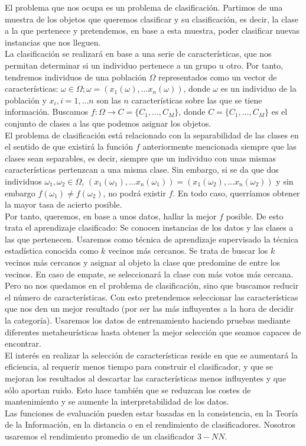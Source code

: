 \documentclass[11pt,leqno]{article}
\begin{document}
El problema que nos ocupa es un problema de clasificación. Partimos de una muestra de los objetos que queremos clasificar y su clasificación, es decir, la clase a la que pertenece y pretendemos, en base a esta muestra, poder clasificar nuevas instancias que nos lleguen.\\
La clasificación se realizará en base a una serie de características, que nos permitan determinar si un individuo pertenece a un grupo u otro. Por tanto, tendremos individuos de una población $\Omega$ representados como un vector de características: $ \omega \in \Omega; \omega = (x_1(\omega), \dots x_n(\omega))$, donde $\omega$ es un individuo de la población y $x_i, i=1,\dots n$ son las $n$ características sobre las que se tiene información. Buscamos $f:\Omega \longrightarrow C=\{C_1, \dots, C_M\}$, donde $C=\{C_1, \dots, C_M\}$ es el conjunto de clases a las que podemos asignar los objetos.\\
El problema de clasificación está relacionado con la separabilidad de las clases en el sentido de que existirá la función $f$  anteriormente mencionada siempre que las clases sean separables, es decir, siempre que un individuo con unas mismas características pertenzcan a una misma clase. Sin embargo, si se da que dos individuos $\omega_1, \omega_2 \in \Omega$, $(x_1(\omega_1), \dots x_n(\omega_1))=(x_1(\omega_2), \dots x_n(\omega_2))$ y sin embargo $f(\omega_1) \neq f(\omega_2)$, no podrá existir $f$. En todo caso, querríamos obtener la mayor tasa de acierto posible.\\  
Por tanto, queremos, en base a unos datos, hallar la mejor $f$ posible. De esto trata el aprendizaje clasificado: Se conocen instancias de los datos y las clases a las que pertenecen. Usaremos como técnica de aprendizaje supervisado la técnica estadística conocida como $k$ vecinos más cercanos. Se trata de buscar los $k$ vecinos más cercanos y asignar al objeto la clase que predomine de entre los vecinos. En caso de empate, se seleccionará la clase con más votos más cercana.\\  
Pero no nos quedamos en el problema de clasificación, sino que buscamos reducir el número de características. Con esto pretendemos seleccionar las características que nos den un mejor resultado (por ser las más influyentes a la hora de decidir la categoría). Usaremos los datos de entrenamiento haciendo pruebas mediante diferentes metaheurísticas hasta obtener la mejor selección que seamos capaces de encontrar.\\  
El interés en realizar la selección de características reside en que se aumentará la eficiencia, al requerir menos tiempo para construir el clasificador, y que se mejoran los resultados al descartar las características menos influyentes y que sólo aportan ruido. Esto hace también que se reduzcan los costes de mantenimiento y se aumente la interpretabilidad de los datos.\\
Las funciones de evaluación pueden estar basadas en la consistencia, en la Teoría de la Información, en la distancia o en el rendimiento de clasificadores. Nosotros usaremos el rendimiento promedio de un clasificador $3-NN$.
\end{document}
